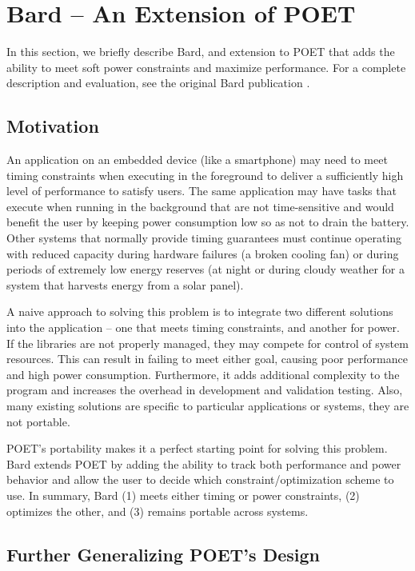 \section{Bard -- An Extension of POET}
\label{sec:poet-bard}

In this section, we briefly describe Bard, and extension to POET that adds the ability to meet soft power constraints and maximize performance.
For a complete description and evaluation, see the original Bard publication \cite{Bard}.


\subsection{Motivation}

An application on an embedded device (like a smartphone) may need to meet timing constraints when executing in the foreground to deliver a sufficiently high level of performance to satisfy users.
The same application may have tasks that execute when running in the background that are not time-sensitive and would benefit the user by keeping power consumption low so as not to drain the battery.
Other systems that normally provide timing guarantees must continue operating with reduced capacity during hardware failures (\eg a broken cooling fan) or during periods of extremely low energy reserves (\eg at night or during cloudy weather for a system that harvests energy from a solar panel).

A naive approach to solving this problem is to integrate two different solutions into the application -- one that meets timing constraints, and another for power.
If the libraries are not properly managed, they may compete for control of system resources.
This can result in failing to meet either goal, causing poor performance and high power consumption.
Furthermore, it adds additional complexity to the program and increases the overhead in development and validation testing.
Also, many existing solutions are specific to particular applications or systems, \ie they are not portable.

POET's portability makes it a perfect starting point for solving this problem.
Bard extends POET by adding the ability to track both performance and power behavior and allow the user to decide which constraint/optimization scheme to use.
In summary, Bard (1) meets either timing or power constraints, (2) optimizes the other, and (3) remains portable across systems.


\subsection{Further Generalizing POET's Design}

